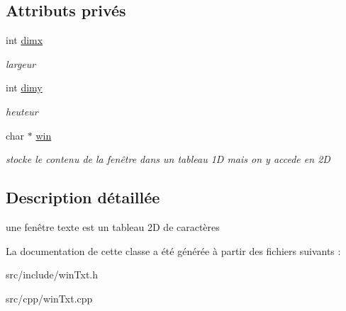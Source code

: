 \subsection*{Attributs privés}
\begin{DoxyCompactItemize}
\item 
\hypertarget{classWinTXT_aae9dd786d11da5b46de6f4ea3041a0ab}{int \hyperlink{classWinTXT_aae9dd786d11da5b46de6f4ea3041a0ab}{dimx}}\label{classWinTXT_aae9dd786d11da5b46de6f4ea3041a0ab}

\begin{DoxyCompactList}\small\item\em largeur \end{DoxyCompactList}\item 
\hypertarget{classWinTXT_ab94c58aaf938cf5e119553ee918b9a19}{int \hyperlink{classWinTXT_ab94c58aaf938cf5e119553ee918b9a19}{dimy}}\label{classWinTXT_ab94c58aaf938cf5e119553ee918b9a19}

\begin{DoxyCompactList}\small\item\em heuteur \end{DoxyCompactList}\item 
\hypertarget{classWinTXT_ace5ef6c746d586385fcea85073bd1d41}{char $\ast$ \hyperlink{classWinTXT_ace5ef6c746d586385fcea85073bd1d41}{win}}\label{classWinTXT_ace5ef6c746d586385fcea85073bd1d41}

\begin{DoxyCompactList}\small\item\em stocke le contenu de la fenêtre dans un tableau 1\+D mais on y accede en 2\+D \end{DoxyCompactList}\end{DoxyCompactItemize}


\subsection{Description détaillée}
une fenêtre texte est un tableau 2\+D de caractères 

La documentation de cette classe a été générée à partir des fichiers suivants \+:\begin{DoxyCompactItemize}
\item 
src/include/win\+Txt.\+h\item 
src/cpp/win\+Txt.\+cpp\end{DoxyCompactItemize}
